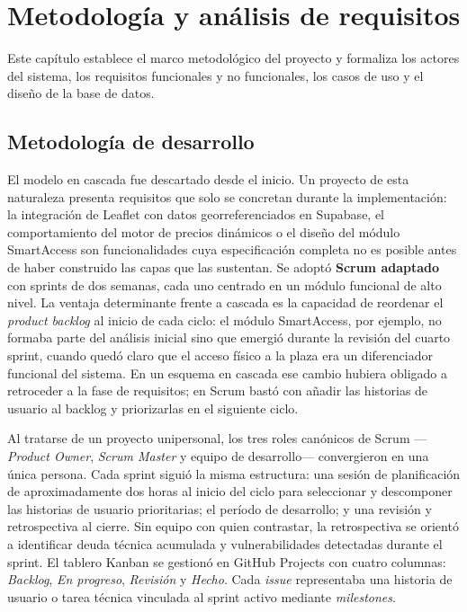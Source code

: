 \chapter{Metodología y análisis de requisitos}
\label{ch:metodologia}

Este capítulo establece el marco metodológico del proyecto y formaliza los actores del sistema, los requisitos funcionales y no funcionales, los casos de uso y el diseño de la base de datos.

\section{Metodología de desarrollo}
\label{sec:metodologia}

El modelo en cascada fue descartado desde el inicio. Un proyecto de esta naturaleza presenta requisitos que solo se concretan durante la implementación: la integración de Leaflet con datos georreferenciados en Supabase, el comportamiento del motor de precios dinámicos o el diseño del módulo SmartAccess son funcionalidades cuya especificación completa no es posible antes de haber construido las capas que las sustentan. Se adoptó \textbf{Scrum adaptado}~\cite{scrum2020} con sprints de dos semanas, cada uno centrado en un módulo funcional de alto nivel. La ventaja determinante frente a cascada es la capacidad de reordenar el \textit{product backlog} al inicio de cada ciclo: el módulo SmartAccess, por ejemplo, no formaba parte del análisis inicial sino que emergió durante la revisión del cuarto sprint, cuando quedó claro que el acceso físico a la plaza era un diferenciador funcional del sistema. En un esquema en cascada ese cambio hubiera obligado a retroceder a la fase de requisitos; en Scrum bastó con añadir las historias de usuario al backlog y priorizarlas en el siguiente ciclo.

Al tratarse de un proyecto unipersonal, los tres roles canónicos de Scrum —\textit{Product Owner}, \textit{Scrum Master} y equipo de desarrollo— convergieron en una única persona. Cada sprint siguió la misma estructura: una sesión de planificación de aproximadamente dos horas al inicio del ciclo para seleccionar y descomponer las historias de usuario prioritarias; el período de desarrollo; y una revisión y retrospectiva al cierre. Sin equipo con quien contrastar, la retrospectiva se orientó a identificar deuda técnica acumulada y vulnerabilidades detectadas durante el sprint. El tablero Kanban se gestionó en GitHub Projects con cuatro columnas: \textit{Backlog}, \textit{En progreso}, \textit{Revisión} y \textit{Hecho}. Cada \textit{issue} representaba una historia de usuario o tarea técnica vinculada al sprint activo mediante \textit{milestones}.

